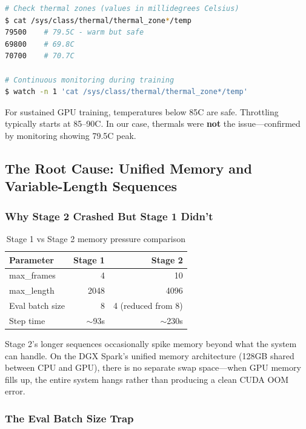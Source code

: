 \documentclass[11pt,a4paper]{article}
\begin{document}
\begin{lstlisting}[language=bash,caption=Monitoring GPU thermals]
# Check thermal zones (values in millidegrees Celsius)
$ cat /sys/class/thermal/thermal_zone*/temp
79500    # 79.5C - warm but safe
69800    # 69.8C
70700    # 70.7C

# Continuous monitoring during training
$ watch -n 1 'cat /sys/class/thermal/thermal_zone*/temp'
\end{lstlisting}

For sustained GPU training, temperatures below 85\textdegree C are safe. Throttling typically starts at 85--90\textdegree C. In our case, thermals were \textbf{not} the issue---confirmed by monitoring showing 79.5\textdegree C peak.

\subsection{The Root Cause: Unified Memory and Variable-Length Sequences}

\subsubsection{Why Stage 2 Crashed But Stage 1 Didn't}

\begin{table}[H]
\centering
\begin{tabular}{@{}lrr@{}}
\toprule
\textbf{Parameter} & \textbf{Stage 1} & \textbf{Stage 2} \\
\midrule
max\_frames & 4 & 10 \\
max\_length & 2048 & 4096 \\
Eval batch size & 8 & 4 (reduced from 8) \\
Step time & $\sim$93s & $\sim$230s \\
\bottomrule
\end{tabular}
\caption{Stage 1 vs Stage 2 memory pressure comparison}
\end{table}

Stage 2's longer sequences occasionally spike memory beyond what the system can handle. On the DGX Spark's unified memory architecture (128GB shared between CPU and GPU), there is no separate swap space---when GPU memory fills up, the entire system hangs rather than producing a clean CUDA OOM error.

\subsubsection{The Eval Batch Size Trap}
\end{document}

